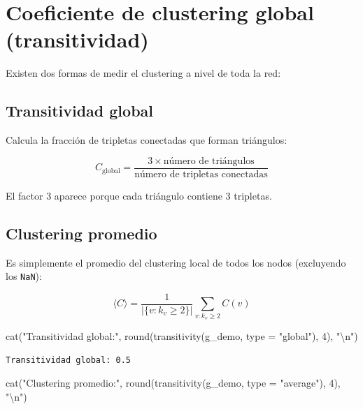 \documentclass[
  letterpaper,
  DIV=11,
  numbers=noendperiod]{scrreprt}
\newenvironment{Shaded}{\begin{snugshade}}{\end{snugshade}}
\newcommand{\AttributeTok}[1]{\textcolor[rgb]{0.40,0.45,0.13}{#1}}
\newcommand{\DecValTok}[1]{\textcolor[rgb]{0.68,0.00,0.00}{#1}}
\newcommand{\FunctionTok}[1]{\textcolor[rgb]{0.28,0.35,0.67}{#1}}
\newcommand{\NormalTok}[1]{\textcolor[rgb]{0.00,0.23,0.31}{#1}}
\newcommand{\SpecialCharTok}[1]{\textcolor[rgb]{0.37,0.37,0.37}{#1}}
\newcommand{\StringTok}[1]{\textcolor[rgb]{0.13,0.47,0.30}{#1}}
\begin{document}
\section{Coeficiente de clustering global
(transitividad)}\label{coeficiente-de-clustering-global-transitividad}

Existen dos formas de medir el clustering a nivel de toda la red:

\subsection{Transitividad global}\label{transitividad-global}

Calcula la fracción de tripletas conectadas que forman triángulos:

\[
C_{\text{global}} = \frac{3 \times \text{número de triángulos}}{\text{número de tripletas conectadas}}
\]

El factor 3 aparece porque cada triángulo contiene 3 tripletas.

\subsection{Clustering promedio}\label{clustering-promedio}

Es simplemente el promedio del clustering local de todos los nodos
(excluyendo los \texttt{NaN}):

\[
\langle C \rangle = \frac{1}{|\{v : k_v \geq 2\}|} \sum_{v: k_v \geq 2} C(v)
\]

\begin{Shaded}
\begin{Highlighting}[]
\FunctionTok{cat}\NormalTok{(}\StringTok{"Transitividad global:"}\NormalTok{, }
    \FunctionTok{round}\NormalTok{(}\FunctionTok{transitivity}\NormalTok{(g\_demo, }\AttributeTok{type =} \StringTok{"global"}\NormalTok{), }\DecValTok{4}\NormalTok{), }\StringTok{"}\SpecialCharTok{\textbackslash{}n}\StringTok{"}\NormalTok{)}
\end{Highlighting}
\end{Shaded}

\begin{verbatim}
Transitividad global: 0.5 
\end{verbatim}

\begin{Shaded}
\begin{Highlighting}[]
\FunctionTok{cat}\NormalTok{(}\StringTok{"Clustering promedio:"}\NormalTok{, }
    \FunctionTok{round}\NormalTok{(}\FunctionTok{transitivity}\NormalTok{(g\_demo, }\AttributeTok{type =} \StringTok{"average"}\NormalTok{), }\DecValTok{4}\NormalTok{), }\StringTok{"}\SpecialCharTok{\textbackslash{}n}\StringTok{"}\NormalTok{)}
\end{Highlighting}
\end{Shaded}
\end{document}
